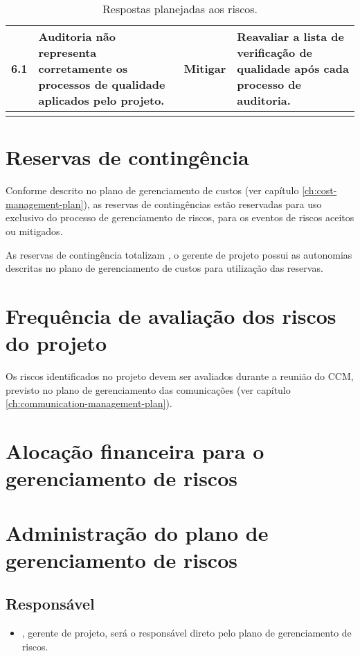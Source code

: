 \begin{longtable}{ c p{} c p{} }
	\midrule
	6.1                      & Auditoria não representa corretamente os processos de qualidade aplicados pelo projeto.                                                                                      & Mitigar                    & Reavaliar a lista de verificação de qualidade após cada processo de auditoria.                                                      \\
	\bottomrule
	\caption{Respostas planejadas aos riscos.}
	\centering
	\label{tab:risk-answers}
\end{longtable}

\section{Reservas de contingência}

Conforme descrito no plano de gerenciamento de custos (ver capítulo \ref{ch:cost-management-plan}), as reservas de contingências estão reservadas para uso exclusivo do processo de gerenciamento de riscos, para os eventos de riscos aceitos ou mitigados.


As reservas de contingência totalizam \contingencyBudget{}, o gerente de projeto possui as autonomias descritas no plano de gerenciamento de custos para utilização das reservas.
\section{Frequência de avaliação dos riscos do projeto}

Os riscos identificados no projeto devem ser avaliados durante a reunião do CCM, previsto no plano de gerenciamento das comunicações (ver capítulo \ref{ch:communication-management-plan}).

\section{Alocação financeira para o gerenciamento de riscos}

\section{Administração do plano de gerenciamento de riscos}

\subsection{Responsável}

\begin{itemize}
	\item \projectManagerName{}, gerente de projeto, será o responsável direto pelo plano de gerenciamento de riscos.
\end{itemize}

